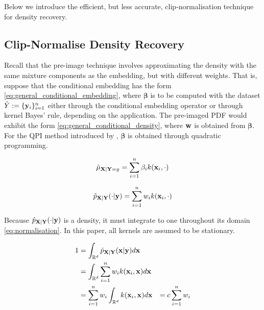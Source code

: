 \documentclass[twoside]{article} \usepackage{aistats2017}
\theoremstyle{definition}
\theoremstyle{theorem}
\newcommand{\ds}[1]{\tilde{#1}}
\newcommand{\qpi}{QPI }
\begin{document}
	Below we introduce the efficient, but less accurate, clip-normalisation technique for density recovery.
	
	\subsection{Clip-Normalise Density Recovery}
	\label{sec:pre_image_quantile_regression:density_recovery}
	
		Recall that the pre-image technique involves approximating the density with the same mixture components as the embedding, but with different weights. That is, suppose that the conditional embedding has the form \eqref{eq:general_conditional_embedding}, where $\bm{\beta}$ is to be computed with the dataset $\ds{Y} := \{\bvec{y}_{i}\}_{i = 1}^{n}$ either through the conditional embedding operator or through kernel Bayes' rule, depending on the application. The pre-imaged PDF would exhibit the form \eqref{eq:general_conditional_density}, where $\mathbf{w}$ is obtained from $\bm{\beta}$. For the \qpi method introduced by \cite{mccalman2013multi}, $\bm{\beta}$ is obtained through quadratic programming.

		\begin{equation}
			\hat{\mu}_{\mathbf{X} | \mathbf{Y} = y}= \sum_{i = 1}^{n} \beta_{i} k(\mathbf{x}_{i}, \cdot)
		\label{eq:general_conditional_embedding}
		\end{equation}
		
		\begin{equation}
			\hat{p}_{\mathbf{X} | \mathbf{Y}}(\cdot | \mathbf{y}) = \sum_{i = 1}^{n} w_{i} k(\mathbf{x}_{i}, \cdot)
		\label{eq:general_conditional_density}
		\end{equation}
		
		Because $\hat{p}_{\mathbf{X} | \mathbf{Y}}(\cdot | \mathbf{y})$ is a density, it must integrate to one throughout its domain \eqref{eq:normalisation}. In this paper, all kernels are assumed to be stationary.
		
		\begin{equation}
			\begin{aligned}
				1 &= \int_{\mathbb{R}^{d}} \hat{p}_{\mathbf{X} | \mathbf{Y}}(\mathbf{x} | \mathbf{y}) d\mathbf{x} \\
				&= \int_{\mathbb{R}^{d}} \sum_{i = 1}^{n} w_{i} k(\mathbf{x}_{i}, \mathbf{x}) d\mathbf{x} \\
				&= \sum_{i = 1}^{n} w_{i} \int_{\mathbb{R}^{d}} k(\mathbf{x}_{i}, \mathbf{x}) d\mathbf{x}
				&= c \sum_{i = 1}^{n} w_{i}
			\end{aligned}
		\label{eq:normalisation}
		\end{equation}
\end{document}
